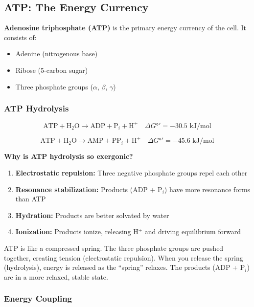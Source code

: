 \subsection{ATP: The Energy Currency}

\begin{definition}
\textbf{Adenosine triphosphate (ATP)} is the primary energy currency of the cell. It consists of:
\begin{itemize}
    \item Adenine (nitrogenous base)
    \item Ribose (5-carbon sugar)
    \item Three phosphate groups ($\alpha$, $\beta$, $\gamma$)
\end{itemize}
\end{definition}

\subsubsection{ATP Hydrolysis}

\[
\text{ATP} + \text{H}_2\text{O} \rightarrow \text{ADP} + \text{P}_i + \text{H}^+ \quad \Delta G°' = -30.5 \text{ kJ/mol}
\]

\[
\text{ATP} + \text{H}_2\text{O} \rightarrow \text{AMP} + \text{PP}_i + \text{H}^+ \quad \Delta G°' = -45.6 \text{ kJ/mol}
\]

\textbf{Why is ATP hydrolysis so exergonic?}
\begin{enumerate}
    \item \textbf{Electrostatic repulsion:} Three negative phosphate groups repel each other
    \item \textbf{Resonance stabilization:} Products (ADP + P$_i$) have more resonance forms than ATP
    \item \textbf{Hydration:} Products are better solvated by water
    \item \textbf{Ionization:} Products ionize, releasing H$^+$ and driving equilibrium forward
\end{enumerate}

\begin{analogy}
ATP is like a compressed spring. The three phosphate groups are pushed together, creating tension (electrostatic repulsion). When you release the spring (hydrolysis), energy is released as the ``spring'' relaxes. The products (ADP + P$_i$) are in a more relaxed, stable state.
\end{analogy}

\subsubsection{Energy Coupling}

